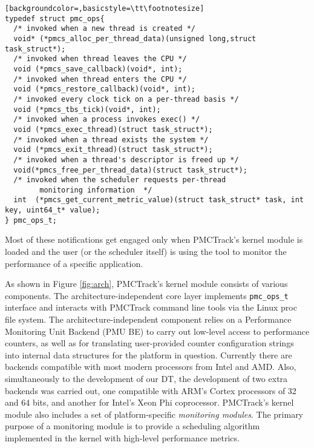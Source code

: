 \begin{lstlisting}[backgroundcolor=,basicstyle=\tt\footnotesize]
typedef struct pmc_ops{
  /* invoked when a new thread is created */
  void* (*pmcs_alloc_per_thread_data)(unsigned long,struct task_struct*);
  /* invoked when thread leaves the CPU */
  void (*pmcs_save_callback)(void*, int);
  /* invoked when thread enters the CPU */
  void (*pmcs_restore_callback)(void*, int);
  /* invoked every clock tick on a per-thread basis */
  void (*pmcs_tbs_tick)(void*, int);
  /* invoked when a process invokes exec() */
  void (*pmcs_exec_thread)(struct task_struct*);
  /* invoked when a thread exists the system */
  void (*pmcs_exit_thread)(struct task_struct*);
  /* invoked when a thread's descriptor is freed up */
  void(*pmcs_free_per_thread_data)(struct task_struct*);
  /* invoked when the scheduler requests per-thread
        monitoring information  */
  int  (*pmcs_get_current_metric_value)(struct task_struct* task, int key, uint64_t* value);
} pmc_ops_t;
\end{lstlisting}


Most of these notifications get engaged only when PMCTrack's kernel
module is loaded and the user (or the scheduler itself) is using the
tool to monitor the performance of a specific application.

As shown in Figure \ref{fig:arch}, PMCTrack's kernel module consists of
various components. The architecture-independent core layer implements
\texttt{pmc\_ops\_t} interface and interacts with PMCTrack command line
tools via the Linux proc file system. The architecture-independent
component relies on a Performance Monitoring Unit Backend (PMU BE) to
carry out low-level access to performance counters, as well as for
translating user-provided counter configuration strings into internal
data structures for the platform in question. Currently there are
backends compatible with most modern processors from Intel and AMD.
Also, simultaneously to the development of our DT, the development of
two extra backends was carried out, one compatible with ARM's Cortex
processors of 32 and 64 bits, and another for Intel's Xeon Phi
coprocessor. PMCTrack's kernel module also includes a set of
platform-specific \textit{monitoring modules}. The primary purpose of a
monitoring module is to provide a scheduling algorithm implemented in
the kernel with high-level performance metrics.


